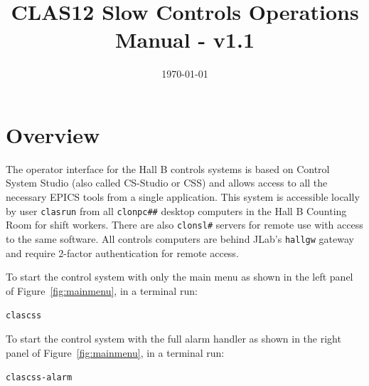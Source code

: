 \documentclass[amsmath,amssymb,notitlepage,11pt]{revtex4}
\begin{document}
\title{CLAS12 Slow Controls Operations Manual - v1.1}
\date{\today}
\begin{abstract}
\end{abstract}

\maketitle

\section{Overview}
The operator interface for the Hall B controls systems is based on Control System Studio (also called CS-Studio or CSS) and allows access to all the necessary EPICS tools from a single application.  This system is accessible locally by user \texttt{clasrun} from all \texttt{clonpc\#\#} desktop computers in the Hall B Counting Room for shift workers.  There are also \texttt{clonsl\#} servers for remote use with access to the same software.  All controls computers are behind JLab's \texttt{hallgw} gateway and require 2-factor authentication for remote access.

To start the control system with only the main menu as shown in the left panel of Figure~\ref{fig:mainmenu}, in a terminal run: \begin{center}\texttt{clascss}\end{center}
To start the control system with the full alarm handler as shown in the right panel of Figure~\ref{fig:mainmenu}, in a terminal run:
\begin{center}\texttt{clascss-alarm}\end{center}
\end{document}
